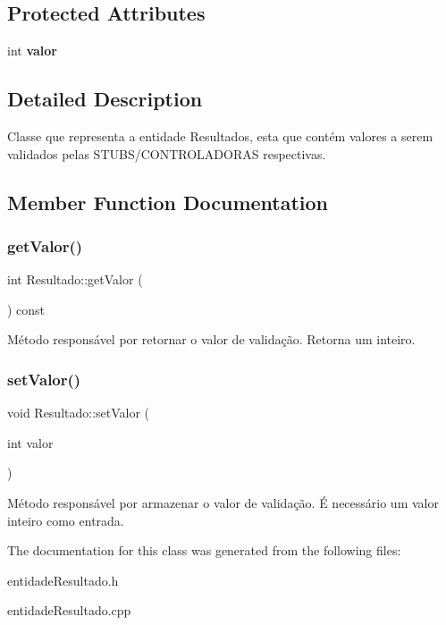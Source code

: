 \subsection*{Protected Attributes}
\begin{DoxyCompactItemize}
\item 
\mbox{\label{classResultado_a452e65ac80b05f5081642c869d960ac9}} 
int {\bfseries valor}
\end{DoxyCompactItemize}


\subsection{Detailed Description}
Classe que representa a entidade Resultados, esta que contém valores a serem validados pelas S\+T\+U\+B\+S/\+C\+O\+N\+T\+R\+O\+L\+A\+D\+O\+R\+AS respectivas. 

\subsection{Member Function Documentation}
\mbox{\label{classResultado_a029dc1436d6ed7963b5b90400e972e15}} 
\subsubsection{\texorpdfstring{get\+Valor()}{getValor()}}
{\footnotesize\ttfamily int Resultado\+::get\+Valor (\begin{DoxyParamCaption}{ }\end{DoxyParamCaption}) const\hspace{0.3cm}{\ttfamily [inline]}}

Método responsável por retornar o valor de validação. Retorna um inteiro. \mbox{\label{classResultado_ab0c3c0ed280eefb95e89d90dc7e239e2}} 
\subsubsection{\texorpdfstring{set\+Valor()}{setValor()}}
{\footnotesize\ttfamily void Resultado\+::set\+Valor (\begin{DoxyParamCaption}\item[{int}]{valor }\end{DoxyParamCaption})\hspace{0.3cm}{\ttfamily [inline]}}

Método responsável por armazenar o valor de validação. É necessário um valor inteiro como entrada. 

The documentation for this class was generated from the following files\+:\begin{DoxyCompactItemize}
\item 
entidade\+Resultado.\+h\item 
entidade\+Resultado.\+cpp\end{DoxyCompactItemize}

